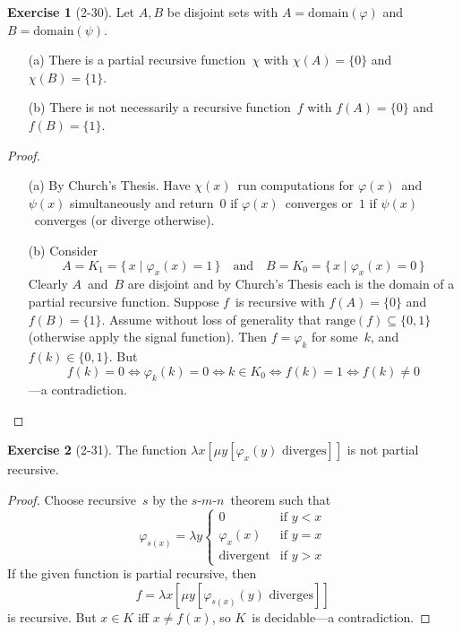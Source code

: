 \documentclass[letterpaper]{article}
\newcommand{\dom}{\mathrm{domain}}
\newcommand{\ran}{\mathrm{range}}
\newcommand{\smn}{$s$-$m$-$n$}
\theoremstyle{definition}
\newtheorem*{exer}{Exercise}
\theoremstyle{remark}
\theoremstyle{direction}
\begin{document}
\begin{exer}[2-30]
Let $A,B$ be disjoint sets with $A=\dom(\varphi)$ and $B=\dom(\psi)$.
\begin{enumerate}[itemsep=0pt]
\item[(a)] There is a partial recursive function~$\chi$ with $\chi(A)=\{0\}$ and $\chi(B)=\{1\}$.
\item[(b)] There is not necessarily a recursive function~$f$ with $f(A)=\{0\}$ and $f(B)=\{1\}$.
\end{enumerate}
\end{exer}
\begin{proof}
\begin{enumerate}[itemsep=0pt]
\item[(a)] By Church's Thesis. Have $\chi(x)$~run computations for $\varphi(x)$~and~$\psi(x)$ simultaneously and return~$0$ if $\varphi(x)$~converges or~$1$ if $\psi(x)$~converges (or diverge otherwise).
\item[(b)] Consider
$$A=K_1=\{\,x\mid\varphi_x(x)=1\,\}\quad\text{and}\quad B=K_0=\{\,x\mid\varphi_x(x)=0\,\}$$
Clearly $A$~and~$B$ are disjoint and by Church's Thesis each is the domain of a partial recursive function. Suppose $f$~is recursive with $f(A)=\{0\}$ and $f(B)=\{1\}$. Assume without loss of generality that $\ran(f)\subseteq\{0,1\}$ (otherwise apply the signal function). Then $f=\varphi_k$ for some~$k$, and $f(k)\in\{0,1\}$. But
$$f(k)=0\iff\varphi_k(k)=0\iff k\in K_0\iff f(k)=1\iff f(k)\ne0$$
---a contradiction.\qedhere
\end{enumerate}
\end{proof}

\begin{exer}[2-31]
The function $\lambda x[\mu y[\varphi_x(y)\text{ diverges}]]$ is not partial recursive.
\end{exer}
\begin{proof}
Choose recursive~$s$ by the \smn\ theorem such that
$$\varphi_{s(x)}=\lambda y\begin{cases}
0&\text{if }y<x\\
\varphi_x(x)&\text{if }y=x\\
\text{divergent}&\text{if }y>x
\end{cases}$$
If the given function is partial recursive, then
$$f=\lambda x[\mu y[\varphi_{s(x)}(y)\text{ diverges}]]$$
is recursive. But $x\in K$ iff $x\ne f(x)$, so $K$~is decidable---a contradiction.
\end{proof}
\end{document}
